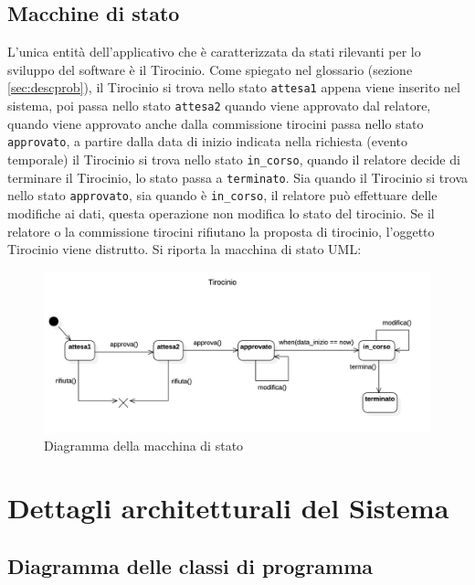 \documentclass[12pt]{article}
\begin{document}
\newpage


\subsection{Macchine di stato}
\label{subsec:state}

L'unica entità dell'applicativo che è caratterizzata da stati rilevanti per lo sviluppo del software è il Tirocinio. Come spiegato nel glossario (sezione \ref{sec:descprob}), il Tirocinio si trova nello stato \texttt{attesa1} appena viene inserito nel sistema, poi passa nello stato \texttt{attesa2} quando viene approvato dal relatore, quando viene approvato anche dalla commissione tirocini passa nello stato \texttt{approvato}, a partire dalla data di inizio indicata nella richiesta (evento temporale) il Tirocinio si trova nello stato \texttt{in\_corso}, quando il relatore decide di terminare il Tirocinio, lo stato passa a \texttt{terminato}. Sia quando il Tirocinio si trova nello stato \texttt{approvato}, sia quando è \texttt{in\_corso}, il relatore può effettuare delle modifiche ai dati, questa operazione non modifica lo stato del tirocinio. Se il relatore o la commissione tirocini rifiutano la proposta di tirocinio, l'oggetto Tirocinio viene distrutto.
Si riporta la macchina di stato UML:

\begin{figure}[h!]
   \centering
   \includegraphics[width=\textwidth]{images/StatechartDiagram1.jpg}
   \caption*{Diagramma della macchina di stato}
\end{figure}

\section{Dettagli architetturali del Sistema}
\subsection{Diagramma delle classi di programma}
\label{sec:claprogramma}
\end{document}
